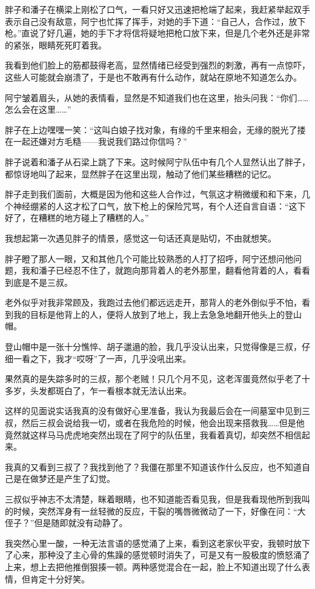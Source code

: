 胖子和潘子在横梁上刚松了口气，一看只好又迅速把枪端了起来，我赶紧举起双手表示自己没有敌意，阿宁也忙挥了挥手，对她的手下道：“自己人，合作过，放下枪。”直说了好几遍，她的手下才将信将疑地把枪口放下来，但是几个老外还是非常的紧张，眼睛死死盯着我。

我看到他们脸上的筋都鼓得老高，显然情绪已经受到强烈的刺激，再有一点惊吓，这些人可能就会崩溃了，于是也不敢再有什么动作，就站在原地不知道怎么办。

阿宁皱着眉头，从她的表情看，显然是不知道我们也在这里，抬头问我：“你们……怎么会在这里……”

胖子在上边嘿嘿一笑：“这叫白娘子找对象，有缘的千里来相会，无缘的脱光了搂在一起还嫌对方毛糙——我说我们路过你信吗？”

胖子说着和潘子从石梁上跳了下来。这时候阿宁队伍中有几个人显然认出了胖子，都惊讶地叫了起来，显然胖子在这里出现，触动了他们某些糟糕的记忆。

胖子走到我们面前，大概是因为他和这些人合作过，气氛这才稍微缓和和下来，几个神经绷紧的人这才松了口气，放下枪上的保险咒骂，有个人还自言自语：“这下好了，在糟糕的地方碰上了糟糕的人。”

我想起第一次遇见胖子的情景，感觉这一句话还真是贴切，不由就想笑。

胖子瞪了那人一眼，又和其他几个可能比较熟悉的人打了招呼，阿宁还想问他问题，我和潘子已经忍不住了，就跑向那背着人的老外那里，翻看他背着的人，看看到底是不是三叔。

老外似乎对我非常顾及，我跑过去他们都远远走开，那背人的老外倒似乎不怕，看到我的目标是他背上的人，便将人放到了地上，我上去急急地翻开他头上的登山帽。

登山帽中是一张十分憔悴、胡子邋遢的脸，我几乎没认出来，只觉得像是三叔，仔细一看之下，我才“哎呀”了一声，几乎没吼出来。

果然真的是失踪多时的三叔，那个老贼！只几个月不见，这老浑蛋竟然似乎老了十多岁，头发都斑白了，乍一看根本就无法认出来。

这样的见面说实话我真的没有做好心里准备，我认为我最后会在一间墓室中见到三叔，然后三叔会说给我一切，或者在我危险的时候，他会出现来搭救我……但是他竟然就这样马马虎虎地突然出现在了阿宁的队伍里，我看着真切，却突然不相信起来。

我真的又看到三叔了？我找到他了？我僵在那里不知道该作什么反应，也不知道自己是在做梦还是产生了幻觉。

三叔似乎神志不太清楚，眯着眼睛，也不知道能否看见我，但是我看现他所到我叫的时候，突然浑身有一丝轻微的反应，干裂的嘴唇微微动了一下，好像在问：“大侄子？”但是随即就没有动静了。

我突然心里一酸，一种无法言语的感觉涌了上来，看到这老家伙平安，我顿时放下了心来，那种没了主心骨的焦躁的感觉顿时消失了，可是又有一股极度的愤怒涌了上来，想上去把他推倒狠揍一顿。两种感觉混合在一起，脸上不知道出现了什么表情，但肯定十分好笑。

